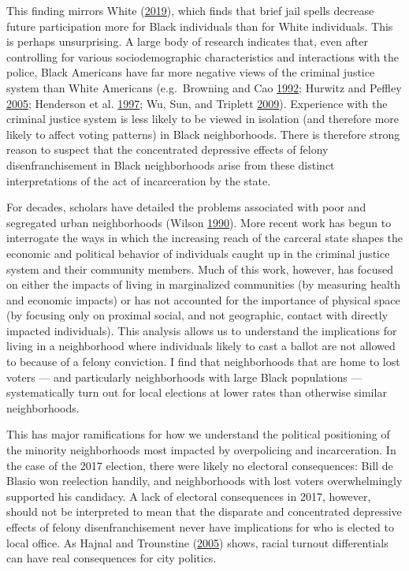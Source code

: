 \documentclass[12pt,]{article}
\begin{document}
This finding mirrors White (\protect\hyperlink{ref-White2019}{2019}), which finds that brief jail spells decrease future participation more for Black individuals than for White individuals. This is perhaps unsurprising. A large body of research indicates that, even after controlling for various sociodemographic characteristics and interactions with the police, Black Americans have far more negative views of the criminal justice system than White Americans (e.g.~Browning and Cao \protect\hyperlink{ref-Browning1992}{1992}; Hurwitz and Peffley \protect\hyperlink{ref-Hurwitz2005}{2005}; Henderson et al. \protect\hyperlink{ref-Henderson1997}{1997}; Wu, Sun, and Triplett \protect\hyperlink{ref-Wu2009}{2009}). Experience with the criminal justice system is less likely to be viewed in isolation (and therefore more likely to affect voting patterns) in Black neighborhoods. There is therefore strong reason to suspect that the concentrated depressive effects of felony disenfranchisement in Black neighborhoods arise from these distinct interpretations of the act of incarceration by the state.

For decades, scholars have detailed the problems associated with poor and segregated urban neighborhoods (Wilson \protect\hyperlink{ref-Wilson1990}{1990}). More recent work has begun to interrogate the ways in which the increasing reach of the carceral state shapes the economic and political behavior of individuals caught up in the criminal justice system and their community members. Much of this work, however, has focused on either the impacts of living in marginalized communities (by measuring health and economic impacts) or has not accounted for the importance of physical space (by focusing only on proximal social, and not geographic, contact with directly impacted individuals). This analysis allows us to understand the implications for living in a neighborhood where individuals likely to cast a ballot are not allowed to because of a felony conviction. I find that neighborhoods that are home to lost voters --- and particularly neighborhoods with large Black populations --- systematically turn out for local elections at lower rates than otherwise similar neighborhoods.

This has major ramifications for how we understand the political positioning of the minority neighborhoods most impacted by overpolicing and incarceration. In the case of the 2017 election, there were likely no electoral consequences: Bill de Blasio won reelection handily, and neighborhoods with lost voters overwhelmingly supported his candidacy. A lack of electoral consequences in 2017, however, should not be interpreted to mean that the disparate and concentrated depressive effects of felony disenfranchisement never have implications for who is elected to local office. As Hajnal and Trounstine (\protect\hyperlink{ref-Hajnal2005}{2005}) shows, racial turnout differentials can have real consequences for city politics.
\end{document}
